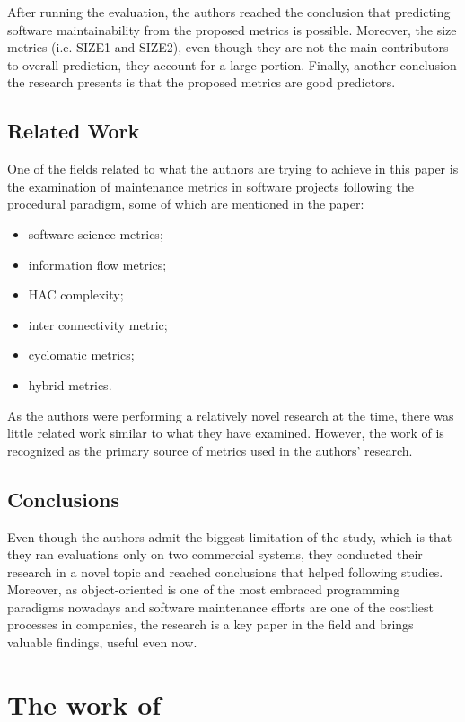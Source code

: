 \documentclass[a4paper,12pt]{article}
\begin{document}
After running the evaluation, the authors reached the conclusion that predicting
software maintainability from the proposed metrics is possible. Moreover, the size
metrics (i.e. SIZE1 and SIZE2), even though they are not the main contributors to
overall prediction, they account for a large portion. Finally, another conclusion
the research presents is that the proposed metrics are good predictors.

\subsection{Related Work}
One of the fields related to what the authors are trying to achieve in this
paper is the examination of maintenance metrics in software projects following
the procedural paradigm, some of which are mentioned in the paper:
 \begin{itemize}
  \item \citet{halstead1977elements} software science metrics;
  \item \citet{henry1981software} information flow metrics;
  \item \citet{bail1988program} HAC complexity;
  \item \citet{robillard1989interconnectivity} inter connectivity metric;
  \item \citet{mccabe1976complexity} cyclomatic metrics;
  \item \citet{adamov1990proposal} hybrid metrics.
 \end{itemize}
As the authors were performing a relatively novel research at the time, 
there was little related work similar to what they have examined. However,
the work of \citet{chidamber1994metrics} is recognized as the primary
source of metrics used in the authors' research.

\subsection{Conclusions}
Even though the authors admit the biggest limitation of the study, which is
that they ran evaluations only on two commercial systems, they conducted their research
in a novel topic and reached conclusions that helped following studies. Moreover, 
as object-oriented is one of the most embraced programming paradigms nowadays and 
software maintenance efforts are one of the costliest processes in companies, the
research is a key paper in the field and brings valuable findings, useful even now.
 
\section{The work of \cite{oman1992metrics}}
\end{document}
